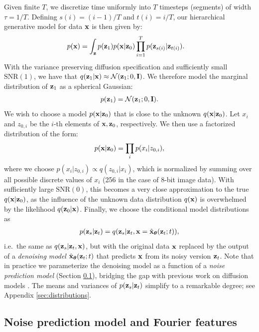 \documentclass{article}
\newcommand{\snr}{\text{SNR}}
\begin{document}
Given finite $T$, we discretize time uniformly into $T$ timesteps (segments) of width $\tau = 1/T$. Defining $s(i) = (i-1)/T$ and $t(i) = i/T$, our hierarchical generative model for data ${\mathbf{x}}$ is then given by:
\begin{align}
p({\mathbf{x}}) &= \int_{{\mathbf{z}}} p({\mathbf{z}}_{1})p({\mathbf{x}}|{\mathbf{z}}_{0}) \prod_{i=1}^T p({\mathbf{z}}_{s(i)}|{\mathbf{z}}_{t(i)}).
\end{align}
With the variance preserving diffusion specification and sufficiently small $\snr(1)$, we have that $q({\mathbf{z}}_1|{\mathbf{x}}) \approx \mathcal{N}({\mathbf{z}}_1; 0,\mathbf{I})$. We therefore model the marginal distribution of ${\mathbf{z}}_1$ as a spherical Gaussian: 
\begin{align}
    p({\mathbf{z}}_1) = \mathcal{N}({\mathbf{z}}_1; 0, \mathbf{I}).
\end{align}
We wish to choose a model $p({\mathbf{x}}|{\mathbf{z}}_0)$ that is close to the unknown $q({\mathbf{x}}|{\mathbf{z}}_0)$. Let $x_i$ and $z_{0,i}$ be the $i$-th elements of ${\mathbf{x}},  {\mathbf{z}}_0$, respectively. We then use a factorized distribution of the form:
\begin{align}
p({\mathbf{x}}|{\mathbf{z}}_0) = \prod_i p(x_i|z_{0,i})\label{eq:recon},
\end{align}
where we choose $p(x_i |z_{0,i}) \propto q(z_{0,i}|x_i)$, which is normalized by summing over all possible discrete values of $x_i$ (256 in the case of 8-bit image data). With sufficiently large $\snr(0)$, this becomes a very close approximation to the true $q({\mathbf{x}}|{\mathbf{z}}_0)$, as the influence of the unknown data distribution $q({\mathbf{x}})$ is overwhelmed by the likelihood $q({\mathbf{z}}_0|{\mathbf{x}})$.
Finally, we choose the conditional model distributions as \begin{align}p({\mathbf{z}}_s|{\mathbf{z}}_t) = q({\mathbf{z}}_s|{\mathbf{z}}_t, {\mathbf{x}}=\hat{{\mathbf{x}}}_{{\boldsymbol{\theta}}}({\mathbf{z}}_t; t)),
\end{align}
i.e.\ the same as $q({\mathbf{z}}_s|{\mathbf{z}}_t,\mathbf{x})$, but with the original data ${\mathbf{x}}$ replaced by the output of a \emph{denoising model} $\hat{{\mathbf{x}}}_{{\boldsymbol{\theta}}}({\mathbf{z}}_t; t)$ that predicts ${\mathbf{x}}$ from its noisy version ${\mathbf{z}}_t$. Note that in practice we parameterize the denoising model as a function of a \emph{noise prediction model} (Section \ref{sec:noisepred}), bridging the gap with previous work on diffusion models \citep{ho2020denoising}. The means and variances of $p({\mathbf{z}}_s|{\mathbf{z}}_t)$ simplify to a remarkable degree; see Appendix \ref{sec:distributions}. 

\subsection{Noise prediction model and Fourier features}
\label{sec:noisepred}
\end{document}

